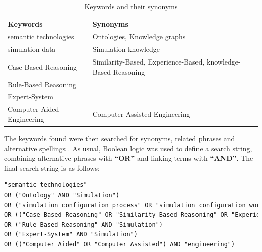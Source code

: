             \begin{table}[h]
                \centering
        	    {
        	    \begin{tabular}{ | m{5.5cm} | m{9cm} | }
                    \hline
                    \rowcolor{teal!30} Keywords & Synonyms \\
                    
                    \hline
                    semantic technologies  & Ontologies, Knowledge graphs\\
                    
                    \hline
                    simulation data & Simulation knowledge\\
                    
                    \hline
                    Case-Based Reasoning  & Similarity-Based, Experience-Based, knowledge-Based Reasoning\\
                    
                    \hline
                    Rule-Based Reasoning  & \\
                    
                    \hline
                    Expert-System  & \\
                    
                    \hline
                    Computer Aided Engineering  & Computer Assisted Engineering\\
                    
                    \hline
                \end{tabular}}
                \caption{\label{tab:keyw-syno} Keywords and their synonyms}
            \end{table}

            The keywords found were then searched for synonyms, related phrases and alternative spellings \cite{budgen2006performing}. As usual, Boolean logic was used to define a search string, combining alternative phrases with \textbf{“OR”} and linking terms with \textbf{“AND”}. The final search string is as follows:

            \begin{lstlisting}[language=XML, caption=Generated Query, label={lst:gen-query}]
"semantic technologies" 
OR ("Ontology" AND "Simulation")
OR ("simulation configuration process" OR "simulation configuration workflow" OR "simulation configuration knowledge")
OR (("Case-Based Reasoning" OR "Similarity-Based Reasoning" OR "Experience-Based Reasoning" OR "knowledge-Based Reasoning") AND "Simulation")
OR ("Rule-Based Reasoning" AND "Simulation")
OR ("Expert-System" AND "Simulation")
OR (("Computer Aided" OR "Computer Assisted") AND "engineering")
            \end{lstlisting}

